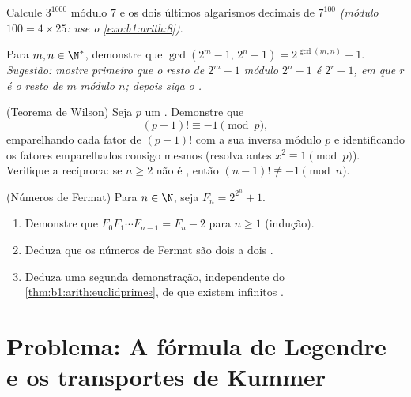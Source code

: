\begin{exercise}[$\star\star$]\label{exo:b1:arith:9}
Calcule $3^{1000}$ módulo $7$ e os dois últimos algarismos decimais de
$7^{100}$ \emph{(módulo $100 = 4 \times 25$: use o
\cref{exo:b1:arith:8})}.
\end{exercise}

\begin{exercise}[$\star\star\star$]\label{exo:b1:arith:10}
Para $m, n \in \N^*$, demonstre que $\gcd(2^m - 1,\, 2^n - 1) =
2^{\gcd(m,n)} - 1$. \emph{Sugestão: mostre primeiro que o resto de $2^m
- 1$ módulo $2^n - 1$ é $2^r - 1$, em que $r$ é o resto de $m$ módulo
$n$; depois siga o .}
\end{exercise}

\begin{exercise}[$\star\star\star$]\label{exo:b1:arith:11}
(Teorema de Wilson) Seja $p$ um . Demonstre que
\[
(p-1)! \equiv -1 \pmod p ,
\]
emparelhando cada fator de $(p-1)!$ com a sua inversa módulo $p$ e
identificando os fatores emparelhados consigo mesmos (resolva antes
$x^2 \equiv 1 \pmod p$). Verifique a recíproca: se $n \geq 2$ não é , então $(n-1)!
\not\equiv -1 \pmod n$.
\end{exercise}

\begin{exercise}[$\star\star\star$]\label{exo:b1:arith:12}
(Números de Fermat) Para $n \in \N$, seja $F_n = 2^{2^n} + 1$.
\begin{enumerate}
  \item Demonstre que $F_0 F_1 \cdots F_{n-1} = F_n - 2$ para $n \geq
        1$ (indução).
  \item Deduza que os números de Fermat são dois a dois .
  \item Deduza uma segunda demonstração, independente do
        \cref{thm:b1:arith:euclidprimes}, de que existem
        infinitos .
\end{enumerate}
\end{exercise}

\section{Problema: A fórmula de Legendre e os transportes de Kummer}

